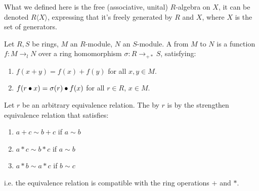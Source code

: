 \begin{remark}
    \label{mk:FreeAlgebra}

    What we defined here is the free (associative, unital) $R$-algebra on $X$, it can be denoted $R\langle X \rangle$,
    expressing that it's freely generated by $R$ and $X$, where $X$ is the set of generators.

\end{remark}

\begin{definition}
    \label{LinearMap}
    \leanok

    Let $R, S$ be rings, $M$ an $R$-module, $N$ an $S$-module.
    A  from $M$ to $N$ is a function $f : M \to_{l} N$ over a ring homomorphism $\sigma : R \to_{+*} S$, satisfying:

    \begin{enumerate}

    \item $f(x + y) = f(x) + f(y)$ for all $x, y \in M$.
    \item $f(r \bullet x) = \sigma(r) \bullet f(x)$ for all $r \in R$, $x \in M$.
    
    \end{enumerate}

\end{definition}

\begin{definition}
    \label{RingQuot}
    \leanok

    Let $r$ be an arbitrary equivalence relation. The  by $r$
    is by the strengthen equivalence relation that satisfies:

    \begin{enumerate}

    \item $a + c \sim b + c$ if $a \sim b$
    \item $a * c \sim b * c$ if $a \sim b$
    \item $a * b \sim a * c$ if $b \sim c$
    
    \end{enumerate}

    i.e. the equivalence relation is compatible with the ring operations $+$ and $*$.

\end{definition}

